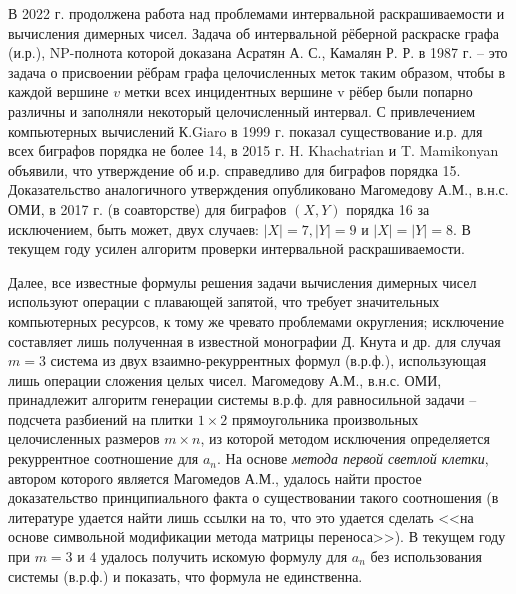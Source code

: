 В 2022 г. продолжена работа над проблемами интервальной раскрашиваемости и вычисления димерных чисел. Задача об интервальной рёберной раскраске графа (и.р.), NP-полнота которой доказана Асратян А. С., Камалян Р. Р. в 1987 г. -- это задача о присвоении рёбрам графа целочисленных меток таким образом, чтобы в каждой вершине $v$ метки всех инцидентных вершине v рёбер были попарно различны и заполняли некоторый целочисленный интервал. С привлечением компьютерных вычислений К.Giaro в 1999 г. показал существование и.р. для всех биграфов порядка не более 14, в 2015 г. H. Khachatrian и T. Mamikonyan объявили, что  утверждение об и.р. справедливо для биграфов порядка 15. Доказательство аналогичного утверждения опубликовано Магомедову А.М., в.н.с. ОМИ, в 2017 г. (в соавторстве) для биграфов $(X,Y)$ порядка 16 за исключением, быть может, двух случаев: $|X|=7, |Y|=9$  и $|X|=|Y|=8$. В текущем году усилен алгоритм проверки интервальной раскрашиваемости.

Далее, все известные формулы решения задачи вычисления димерных чисел используют операции с плавающей запятой, что требует значительных компьютерных ресурсов, к тому же чревато проблемами округления; исключение составляет лишь полученная в известной монографии Д. Кнута и др. для случая $m=3$ система из двух взаимно-рекуррентных формул (в.р.ф.), использующая лишь операции сложения целых чисел.
Магомедову А.М., в.н.с. ОМИ, принадлежит алгоритм генерации системы в.р.ф. для равносильной задачи -- подсчета разбиений на плитки $1\times2$ прямоугольника произвольных целочисленных размеров $m\times n$, из которой методом исключения определяется рекуррентное соотношение для $a_n$. На основе\textit{ метода первой светлой клетки}, автором которого является Магомедов А.М., удалось найти простое доказательство принципиального факта о существовании такого соотношения (в литературе удается найти лишь ссылки на то, что это удается сделать <<на основе символьной модификации метода матрицы переноса>>).
В текущем году при $m=3$ и $4$ удалось получить искомую формулу для $a_n$ без использования системы (в.р.ф.) и показать, что формула не единственна. 

